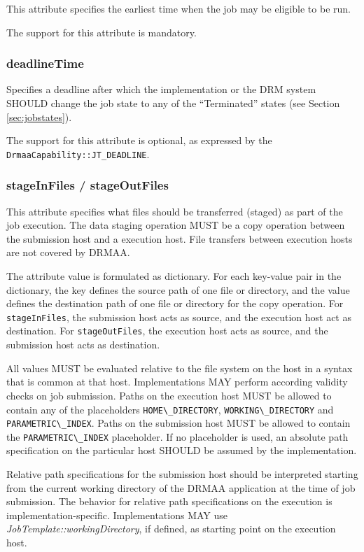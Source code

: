 \documentclass{article}
\newcommand{\h}[1]{\lstinline|#1|}
\begin{document}
This attribute specifies the earliest time when the job may be eligible to be run. 

The support for this attribute is mandatory.

\subsubsection{deadlineTime}

Specifies a deadline after which the implementation or the DRM system SHOULD change the job state to any of the \enquote{Terminated} states (see Section \ref{sec:jobstates}).

The support for this attribute is optional, as expressed by the \h{DrmaaCapability::JT_DEADLINE}.

\subsubsection{stageInFiles / stageOutFiles}

This attribute specifies what files should be transferred (staged) as part of the job execution. The data staging operation MUST be a copy operation between the submission host and a execution host. File transfers between execution hosts are not covered by DRMAA.

The attribute value is formulated as dictionary. For each key-value pair in the dictionary, the key defines the source path of one file or directory, and the value defines the destination path of one file or directory for the copy operation. For \h{stageInFiles}, the submission host acts as source, and the execution host act as destination.  For \h{stageOutFiles}, the execution host acts as source, and the submission host acts as destination. 

All values MUST be evaluated relative to the file system on the host in a syntax that is common at that host. Implementations MAY perform according validity checks on job submission. Paths on the execution host MUST be allowed to contain any of the placeholders \h{HOME\_DIRECTORY}, \h{WORKING\_DIRECTORY} and \h{PARAMETRIC\_INDEX}. Paths on the submission host MUST be allowed to contain the \h{PARAMETRIC\_INDEX} placeholder. If no placeholder is used, an absolute path specification on the particular host SHOULD be assumed by the implementation. 

Relative path specifications for the submission host should be interpreted starting from the current working directory of the DRMAA application at the time of job submission. The behavior for relative path specifications on the execution is implementation-specific. Implementations MAY use \emph{JobTemplate::workingDirectory}, if defined, as starting point on the execution host.
\end{document}
